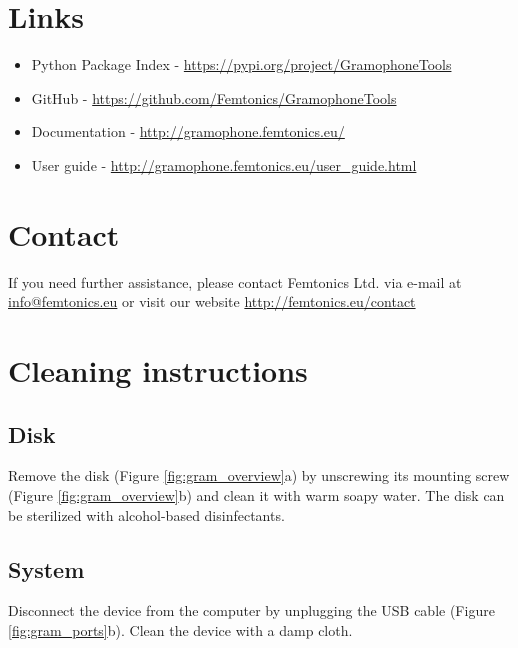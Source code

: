 \documentclass[11pt,a4paper]{article}
\newcommand{\enote}[1]{\textcolor{RubineRed}{#1}}
\newcommand{\hlink}[1]{\href{#1}{#1}}
\newcommand{\mlink}[1]{\href{mailto:#1}{#1}}
\begin{document}
\section{Links}
\begin{itemize}
\item Python Package Index - \hlink{https://pypi.org/project/GramophoneTools}
\item GitHub - \hlink{https://github.com/Femtonics/GramophoneTools}
\item Documentation - \hlink{http://gramophone.femtonics.eu/}
\item User guide - \hlink{http://gramophone.femtonics.eu/user\_guide.html}
\end{itemize}


\section{Contact}
If you need further assistance, please contact Femtonics Ltd. via e-mail at \mlink{info@femtonics.eu} or visit our website \hlink{http://femtonics.eu/contact}

\section{Cleaning instructions}
\subsection{Disk}
Remove the disk (Figure \ref{fig:gram_overview}a) by unscrewing its mounting screw (Figure \ref{fig:gram_overview}b) and clean it with warm soapy water. The disk can be sterilized with alcohol-based disinfectants.

\subsection{System}
Disconnect the device from the computer by unplugging the USB cable (Figure \ref{fig:gram_ports}b). Clean the device with a damp cloth.

\newpage
\end{document}
